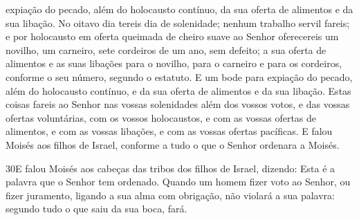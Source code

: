 expiação do pecado, além do holocausto contínuo, da sua oferta de
alimentos e da sua libação. No oitavo dia tereis dia de
solenidade; nenhum trabalho servil fareis; e por holocausto
em oferta queimada de cheiro suave ao Senhor oferecereis um novilho,
um carneiro, sete cordeiros de um ano, sem defeito; a sua
oferta de alimentos e as suas libações para o novilho, para o
carneiro e para os cordeiros, conforme o seu número, segundo o
estatuto. E um bode para expiação do pecado, além do
holocausto contínuo, e da sua oferta de alimentos e da sua libação.
Estas coisas fareis ao Senhor nas vossas solenidades além dos
vossos votos, e das vossas ofertas voluntárias, com os vossos
holocaustos, e com as vossas ofertas de alimentos, e com as vossas
libações, e com as vossas ofertas pacíficas. E falou Moisés
aos filhos de Israel, conforme a tudo o que o Senhor ordenara a
Moisés.

\medskip

\lettrine{30} E falou Moisés aos cabeças das tribos dos filhos
de Israel, dizendo: Esta é a palavra que o Senhor tem ordenado.
Quando um homem fizer voto ao Senhor, ou fizer juramento,
ligando a sua alma com obrigação, não violará a sua palavra: segundo
tudo o que saiu da sua boca, fará.


